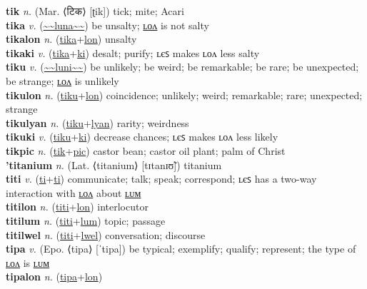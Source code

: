 \textbf{tik} \textit{n.} (Mar. ⟨टिक⟩ [ʈik])
tick; mite; Acari \label{tik} \\
\textbf{tika} \textit{v.} (\hyperref[luna]{\~{}\~{}luna\~{}\~{}})
be unsalty; \hyperref[tikalon]{ʟᴏᴧ} is not salty \label{tika} \\
\textbf{tikalon} \textit{n.} (\hyperref[tika]{tika}+\hyperref[lon]{lon})
unsalty \label{tikalon} \\
\textbf{tikaki} \textit{v.} (\hyperref[tika]{tika}+\hyperref[ki]{ki})
desalt; purify; ʟєꜱ makes ʟᴏᴧ less salty \label{tikaki} \\
\textbf{tiku} \textit{v.} (\hyperref[luni]{\~{}\~{}luni\~{}\~{}})
be unlikely; be weird; be remarkable; be rare; be unexpected; be strange; \hyperref[tikulon]{ʟᴏᴧ} is unlikely \label{tiku} \\
\textbf{tikulon} \textit{n.} (\hyperref[tiku]{tiku}+\hyperref[lon]{lon})
coincidence; unlikely; weird; remarkable; rare; unexpected; strange \label{tikulon} \\
\textbf{tikulyan} \textit{n.} (\hyperref[tiku]{tiku}+\hyperref[lyan]{lyan})
rarity; weirdness \label{tikulyan} \\
\textbf{tikuki} \textit{v.} (\hyperref[tiku]{tiku}+\hyperref[ki]{ki})
decrease chances; ʟєꜱ makes ʟᴏᴧ less likely \label{tikuki} \\
\textbf{tikpic} \textit{n.} (\hyperref[tik]{tik}+\hyperref[pic]{pic})
castor bean; castor oil plant; palm of Christ \label{tikpic} \\
\textbf{'titanium} \textit{n.} (Lat. ⟨titanium⟩ [tɪtanɪʊ̃])
titanium \label{'titanium} \\
\textbf{titi} \textit{v.} (\hyperref[ti]{ti}+\hyperref[ti]{ti})
communicate; talk; speak; correspond; ʟєꜱ has a two-way interaction with \hyperref[titilon]{ʟᴏᴧ} about \hyperref[titilum]{ʟᴜᴍ} \label{titi} \\
\textbf{titilon} \textit{n.} (\hyperref[titi]{titi}+\hyperref[lon]{lon})
interlocutor \label{titilon} \\
\textbf{titilum} \textit{n.} (\hyperref[titi]{titi}+\hyperref[lum]{lum})
topic; passage \label{titilum} \\
\textbf{titilwel} \textit{n.} (\hyperref[titi]{titi}+\hyperref[lwel]{lwel})
conversation; discourse \label{titilwel} \\
\textbf{tipa} \textit{v.} (Epo. ⟨tipa⟩ [ˈtipa])
be typical; exemplify; qualify; represent; the type of \hyperref[tipalon]{ʟᴏᴧ} is \hyperref[tipalum]{ʟᴜᴍ} \label{tipa} \\
\textbf{tipalon} \textit{n.} (\hyperref[tipa]{tipa}+\hyperref[lon]{lon})
